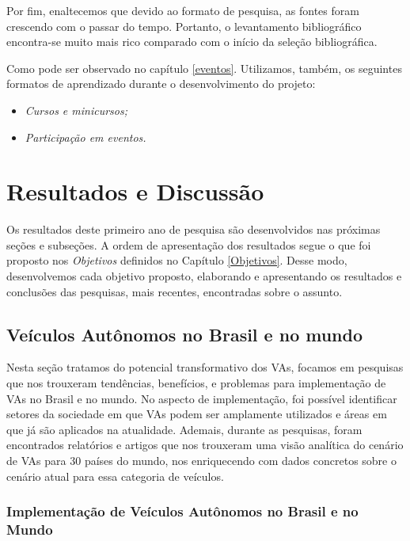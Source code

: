 Por fim, enaltecemos que devido ao formato de pesquisa, as fontes foram crescendo com o passar do tempo. Portanto, o levantamento bibliográfico encontra-se muito mais rico comparado com o início da seleção bibliográfica.


\vspace {0,5cm}

Como pode ser observado no capítulo \ref{eventos}. Utilizamos, também, os seguintes formatos de aprendizado durante o desenvolvimento do projeto:
\begin{itemize}
\item \textit{Cursos e minicursos;}
\item \textit{Participação em eventos.}
\end{itemize}

\newpage

\chapter{Resultados e Discussão} \label{resultados}

Os resultados deste primeiro ano de pesquisa são desenvolvidos nas próximas seções e subseções. A ordem de apresentação dos resultados segue o que foi proposto nos \textit{Objetivos} definidos no Capítulo \ref{Objetivos}. Desse modo, desenvolvemos cada objetivo proposto, elaborando e apresentando os resultados e conclusões das pesquisas, mais recentes, encontradas sobre o assunto.

\section{Veículos Autônomos no Brasil e no mundo}

Nesta seção tratamos do potencial transformativo dos VAs, focamos em pesquisas que nos trouxeram tendências, benefícios, e problemas para implementação de VAs no Brasil e no mundo. No aspecto de implementação, foi possível identificar setores da sociedade em que VAs podem ser amplamente utilizados e áreas em que já são aplicados na atualidade. Ademais, durante as pesquisas, foram encontrados relatórios e artigos que nos trouxeram uma visão analítica do cenário de VAs para 30 países do mundo, nos enriquecendo com dados concretos sobre o cenário atual para essa categoria de veículos. 

\subsection{Implementação de Veículos Autônomos no Brasil e no Mundo}

